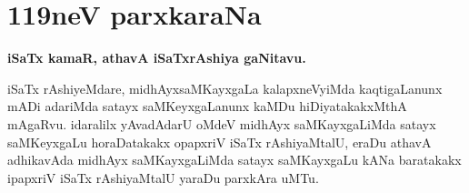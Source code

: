 \chapter{119neV parxkaraNa}

\begin{center}
{\bf\large iSaTx kamaR, athavA iSaTxrAshiya gaNitavu.}
\end{center}

iSaTx rAshiyeMdare, midhAyxsaMKayxgaLa kalapxneVyiMda kaqtigaLanunx mADi adariMda satayx saMKeyxgaLanunx kaMDu hiDiya\-takakxMthA mAgaRvu. idaralilx yAvadAdarU oMdeV midhAyx saMKayxgaLiMda satayx saMKeyxgaLu horaDatakakx opapxriV iSaTx rAshiyaMtalU, eraDu athavA adhikavAda midhAyx saMKayxgaLiMda satayx saMKayxgaLu kANa baratakakx ipapxriV iSaTx rAshiyaMtalU yaraDu parxkAra uMTu.
